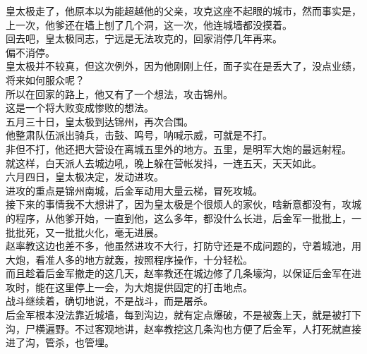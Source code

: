 \begin{multicols}{\theparacolNo}
皇太极走了，他原本以为能超越他的父亲，攻克这座不起眼的城市，然而事实是，上一次，他爹还在墙上刨了几个洞，这一次，他连城墙都没摸着。\\

回去吧，皇太极同志，宁远是无法攻克的，回家消停几年再来。\\

偏不消停。\\

皇太极并不较真，但这次例外，因为他刚刚上任，面子实在是丢大了，没点业绩，将来如何服众呢？\\

所以在回家的路上，他又有了一个想法，攻击锦州。\\

这是一个将大败变成惨败的想法。\\

五月三十日，皇太极到达锦州，再次合围。\\

他整肃队伍派出骑兵，击鼓、鸣号，呐喊示威，可就是不打。\\

非但不打，他还把大营设在离城五里外的地方。五里，是明军大炮的最远射程。\\

就这样，白天派人去城边吼，晚上躲在营帐发抖，一连五天，天天如此。\\

六月四日，皇太极决定，发动进攻。\\

进攻的重点是锦州南城，后金军动用大量云梯，冒死攻城。\\

接下来的事情我不大想讲了，因为皇太极是个很烦人的家伙，啥新意都没有，攻城的程序，从他爹开始，一直到他，这么多年，都没什么长进，后金军一批批上，一批批死，又一批批火化，毫无进展。\\

赵率教这边也差不多，他虽然进攻不大行，打防守还是不成问题的，守着城池，用大炮，看准人多的地方就轰，按照程序操作，十分轻松。\\

而且趁着后金军撤走的这几天，赵率教还在城边修了几条壕沟，以保证后金军在进攻时，能在这里停上一会，为大炮提供固定的打击地点。\\

战斗继续着，确切地说，不是战斗，而是屠杀。\\

后金军根本没法靠近城墙，每到沟边，就有定点爆破，不是被轰上天，就是被打下沟，尸横遍野。不过客观地讲，赵率教挖这几条沟也方便了后金军，人打死就直接进了沟，管杀，也管埋。\\


\end{multicols}
